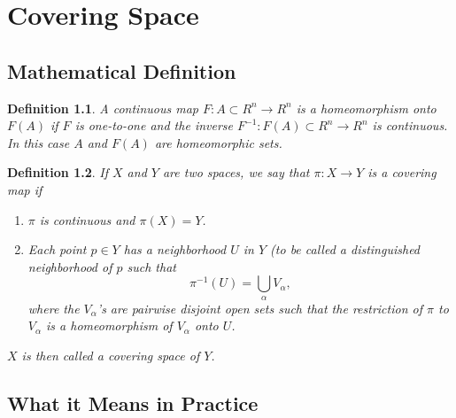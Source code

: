 \chapter{Covering Space}
\section{Mathematical Definition}
\newtheorem{dfn}{Definition}
\begin{dfn}
A continuous map $F:A \subset R^n \to R^n$ is a {\em homeomorphism} onto $F(A)$ if $F$ is one-to-one and the inverse $F^{-1}:F(A) \subset R^n \to R^n$ is continuous. In this case $A$ and $F(A)$ are {\em homeomorphic sets}.
\end{dfn}
\begin{dfn}
If $X$ and $Y$ are two spaces, we say that $\pi: X \to Y$ is a {\em covering map} if
  \begin{enumerate}
	\item $\pi$ is continuous and $\pi(X)=Y$.
	\item Each point $p \in Y$ has a neighborhood $U$ in $Y$ (to be called a {\em distinguished neighborhood of $p$} such that $$\pi^{-1}(U) = \bigcup_{\alpha} V_{\alpha},$$
where the $V_{\alpha}$'s are pairwise disjoint open sets such that the restriction of $\pi$ to $V_{\alpha}$ is a homeomorphism of $V_{\alpha}$ onto $U$.
  \end{enumerate}
$X$ is then called a {\em covering space} of $Y$.
\end{dfn}
\section{What it Means in Practice}

